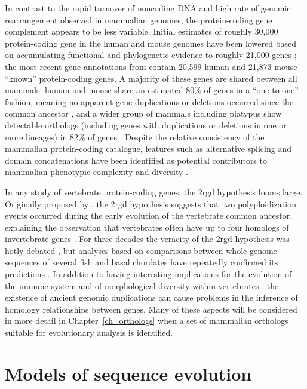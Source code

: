 In contrast to the rapid turnover of noncoding DNA and high rate of
genomic rearrangement observed in mammalian genomes, the
protein-coding gene complement appears to be less variable. Initial
estimates of roughly 30,000 protein-coding gene
\citep{Lander2001,Mouse2002Initial} in the human and mouse genomes
have been lowered based on accumulating functional and phylogenetic
evidence to roughly 21,000 genes \citep{Macaque2007}; the most recent
gene annotations from \ens \citep{Flicek2011} contain 20,599 human and
21,873 mouse ``known'' protein-coding genes. A majority of these genes
are shared between all mammals: human and mouse share an estimated
80\% of genes in a ``one-to-one'' fashion, meaning no apparent gene
duplications or deletions occurred since the common ancestor
\citep{Mouse2002Initial}, and a wider group of mammals including
platypus show detectable orthologs (including genes with duplications
or deletions in one or more lineages) in 82\% of genes
\citep{Warren2008b}. Despite the relative consistency of the mammalian
protein-coding catalogue, features such as alternative splicing and
domain concatenations have been identified as potential contributors
to mammalian phenotypic complexity and diversity \citep{Lander2001}.

In any study of vertebrate protein-coding genes, the \ac{2rgd}
hypothesis looms large. Originally proposed by \citet{Ohno1970}, the
\ac{2rgd} hypothesis suggests that two polyploidization events occurred
during the early evolution of the vertebrate common ancestor,
explaining the observation that vertebrates often have up to four
homologs of invertebrate genes \citep{Hokamp2003}. For three decades
the veracity of the \ac{2rgd} hypothesis was hotly debated
\citep{McLysaght2002,Dehal2005}, but analyses based on comparisons
between whole-genome sequences of several fish and basal chordates
have repeatedly confirmed its predictions
\citep{Kasahara2007,Putnam2008b}. In addition to having interesting
implications for the evolution of the immune system and of
morphological diversity within vertebrates
\citep{Hughes1997,Hoffmann1999,Peer2009b}, the existence of ancient
genomic duplications can cause problems in the inference of homology
relationships between genes. Many of these aspects will be considered
in more detail in Chapter~\ref{ch_orthologs} when a set of mammalian
orthologs suitable for evolutionary analysis is identified.

\section{Models of sequence evolution}
\label{section_evolution_models}

